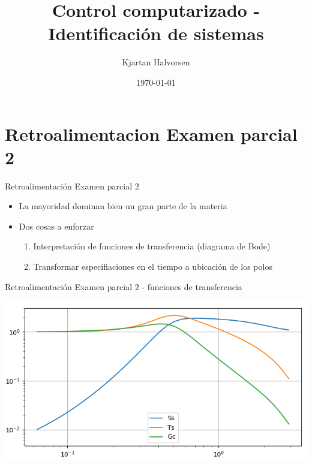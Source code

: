 \documentclass[presentation,aspectratio=169]{beamer}
\author{Kjartan Halvorsen}
\date{\today}
\title{Control computarizado - Identificación de sistemas}
\begin{document}
\maketitle

\section{Retroalimentacion Examen parcial 2}
\label{sec:org77514cb}

\begin{frame}[label={sec:org3ee4b09}]{Retroalimentación Examen parcial 2}
\begin{itemize}
\item La mayoridad dominan bien un gran parte de la materia
\item Dos cosas a enforzar
\begin{enumerate}
\item Interpretación de funciones de transferencia (diagrama de Bode)
\item Transformar especifiaciones en el tiempo a ubicación de los polos
\end{enumerate}
\end{itemize}
\end{frame}

\begin{frame}[label={sec:orgbd3c51f}]{Retroalimentación Examen parcial 2 - funciones de transferencia}
\begin{center}
\includegraphics[width=0.7\linewidth]{../../figures/sensitivity-fcn-bode-example.png}
\end{center}
\end{frame}
\end{document}
